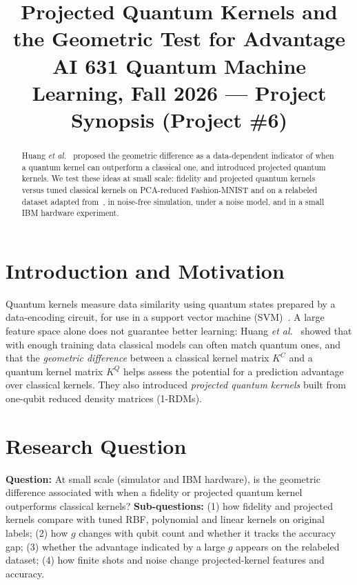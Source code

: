 \documentclass[conference]{IEEEtran}
\begin{document}
\title{Projected Quantum Kernels and the Geometric Test for Advantage\\
\large AI 631 Quantum Machine Learning, Fall 2026 --- Project Synopsis (Project \#6)}

\author{
}

\maketitle

\begin{abstract}
Huang \textit{et al.}~\cite{huang2021} proposed the geometric difference as a data-dependent indicator of when a quantum kernel can outperform a classical one, and introduced projected quantum kernels. We test these ideas at small scale: fidelity and projected quantum kernels versus tuned classical kernels on PCA-reduced Fashion-MNIST and on a relabeled dataset adapted from~\cite{huang2021}, in noise-free simulation, under a noise model, and in a small IBM hardware experiment.
\end{abstract}

\section{Introduction and Motivation}
Quantum kernels measure data similarity using quantum states prepared by a data-encoding circuit, for use in a support vector machine (SVM)~\cite{schuld2019,havlicek2019}. A large feature space alone does not guarantee better learning: Huang \textit{et al.}~\cite{huang2021} showed that with enough training data classical models can often match quantum ones, and that the \emph{geometric difference} between a classical kernel matrix $K^{C}$ and a quantum kernel matrix $K^{Q}$ helps assess the potential for a prediction advantage over classical kernels. They also introduced \emph{projected quantum kernels} built from one-qubit reduced density matrices (1-RDMs).

\section{Research Question}
\textbf{Question:} At small scale (simulator and IBM hardware), is the geometric difference associated with when a fidelity or projected quantum kernel outperforms classical kernels?
\textbf{Sub-questions:} (1) how fidelity and projected kernels compare with tuned RBF, polynomial and linear kernels on original labels; (2) how $g$ changes with qubit count and whether it tracks the accuracy gap; (3) whether the advantage indicated by a large $g$ appears on the relabeled dataset; (4) how finite shots and noise change projected-kernel features and accuracy.
\end{document}

